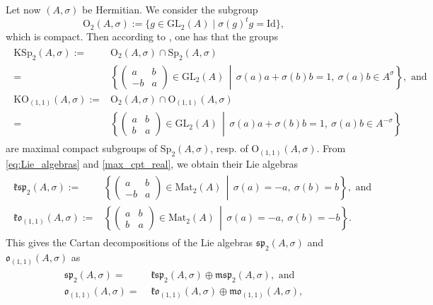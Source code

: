 \documentclass[oneside,11pt]{amsart}
\theoremstyle{definition}
\theoremstyle{remark}
\newcommand{\midwd}{\,\middle\vert\,}
\numberwithin{thm}{section}
\numberwithin{equation}{section}
\begin{document}
Let now $(A,\sigma)$ be Hermitian. We consider the subgroup 
$$\mathrm{O}_2(A,\sigma):=\{g\in\mathrm{GL}_2(A)\mid \sigma(g)^tg=\mathrm{Id}\},$$ 
which is compact. Then according to {\cite[Proposition 3.18, Theorem 3.19]{ABRRW}}, one has that the groups 
\begin{align}\label{max_cpt_real}
    \begin{aligned}
    \mathrm{KSp}_2(A,\sigma):=&\mathrm{O}_2(A,\sigma)\cap\mathrm{Sp}_2(A,\sigma)\\
    =&\left\{\begin{pmatrix}
    a&b\\
    -b&a
    \end{pmatrix}\in\mathrm{GL}_2(A)\midwd \sigma(a)a+\sigma(b)b=1,\ \sigma(a)b\in A^{\sigma}\right\}, \text{ and }\\[2pt]
    \mathrm{KO}_{(1,1)}(A,\sigma):=&\mathrm{O}_2(A,\sigma)\cap\mathrm{O}_{(1,1)}(A,\sigma)\\
    =&\left\{\begin{pmatrix}
    a&b\\
    b&a
    \end{pmatrix}\in\mathrm{GL}_2(A)\midwd \sigma(a)a+\sigma(b)b=1,\ \sigma(a)b\in A^{-\sigma}\right\}
\end{aligned}
\end{align}
are  maximal compact subgroups of $\mathrm{Sp}_2(A,\sigma)$, resp. of $\mathrm{O}_{(1,1)}(A,\sigma)$. From \eqref{eq:Lie_algebras} and \eqref{max_cpt_real}, we obtain their Lie algebras
\begin{align}\label{eq2.2}
    \begin{aligned}
    \mathfrak{ksp}_2(A,\sigma):=&\left\{\begin{pmatrix}
    a&b\\
    -b&a
    \end{pmatrix}\in\mathrm{Mat}_2(A)\midwd \sigma(a)=-a,\ \sigma(b)=b\right\}, \text{ and }\\[2pt]
    \mathfrak{ko}_{(1,1)}(A,\sigma):=&\left\{\begin{pmatrix}
    a&b\\
    b&a
    \end{pmatrix}\in\mathrm{Mat}_2(A)\midwd \sigma(a)=-a,\ \sigma(b)=-b\right\}.
    \end{aligned}
\end{align}
This gives the Cartan decompositions of the Lie algebras $\mathfrak{sp}_2(A,\sigma)$ and $\mathfrak{o}_{(1,1)}(A,\sigma)$ as
\begin{align}\label{Cartan_real}
\begin{aligned}
    \mathfrak{sp}_2(A,\sigma)= & \,\,\mathfrak{ksp}_2(A,\sigma)\oplus\mathfrak{msp}_2(A,\sigma), \text{ and }\\
    \mathfrak{o}_{(1,1)}(A,\sigma)=& \,\,\mathfrak{ko}_{(1,1)}(A,\sigma)\oplus\mathfrak{mo}_{(1,1)}(A,\sigma),
\end{aligned}
\end{align}
\end{document}

